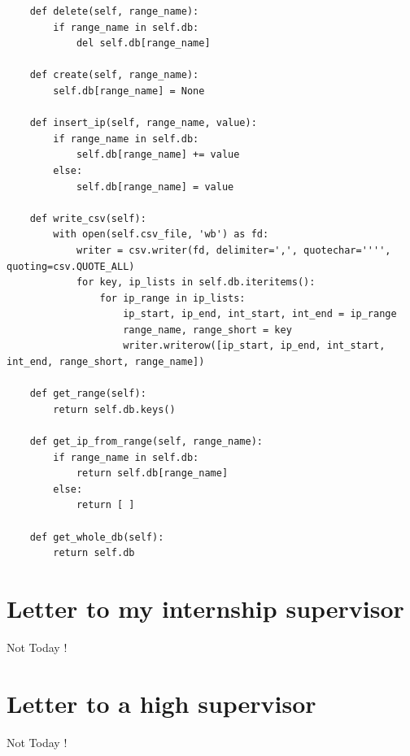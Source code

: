 \documentclass{koala-en}
\begin{document}
\begin{lstlisting}
    def delete(self, range_name):
        if range_name in self.db:
            del self.db[range_name]

    def create(self, range_name):
        self.db[range_name] = None

    def insert_ip(self, range_name, value):
        if range_name in self.db:
            self.db[range_name] += value
        else:
            self.db[range_name] = value

    def write_csv(self):
        with open(self.csv_file, 'wb') as fd:
            writer = csv.writer(fd, delimiter=',', quotechar='''', quoting=csv.QUOTE_ALL)
            for key, ip_lists in self.db.iteritems():
                for ip_range in ip_lists:
                    ip_start, ip_end, int_start, int_end = ip_range
                    range_name, range_short = key
                    writer.writerow([ip_start, ip_end, int_start, int_end, range_short, range_name])

    def get_range(self):
        return self.db.keys()

    def get_ip_from_range(self, range_name):
        if range_name in self.db:
            return self.db[range_name]
        else:
            return [ ]

    def get_whole_db(self):
        return self.db

\end{lstlisting}

\thispagestyle{fancy}
\newpage


\printglossary[style=altlisthypergroup]

\thispagestyle{fancy}

\part{Letter to my internship supervisor}
Not Today !

\thispagestyle{fancy}

\part{Letter to a high supervisor}
Not Today !

\thispagestyle{fancy}
\end{document}
